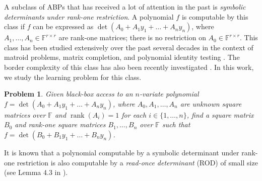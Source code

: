 \documentclass[11pt,letterpaper]{article}
\DeclareMathOperator*{\rank}{rank}
\newcommand{\F}{\mathbb{F}}
\newtheorem{problem}{Problem}[section]
\begin{document}
A subclass of ABPs that has received a lot of attention in the past is \emph{symbolic determinants under rank-one restriction}. A polynomial $f$ is computable by this class if $f$ can be expressed as $\det(A_0 + A_1y_1 + \ldots + A_ny_n)$, where $A_1, \ldots, A_n \in \F^{r \times r}$ are rank-one matrices; there is no restriction on $A_0 \in \F^{r \times r}$. This class has been studied extensively over the past several decades in the context of matroid problems, matrix completion, and polynomial identity testing \cite{Edmonds67, Edmonds68, Edmonds79, Lovasz89, Murota93, Geelen99, HarveyKM05, IvanyosKS10, DBLP:journals/jcss/IvanyosKQS15, GT20}. The border complexity of this class has also been recently investigated \cite{CGGR23}. In this work, we study the learning problem for this class.

\begin{problem} \label{prob:learningROD}
Given black-box access to an $n$-variate polynomial $f = \det(A_0 + A_1y_1 + \ldots + A_ny_n)$, where $A_0, A_1, \ldots, A_n$ are unknown square matrices over $\F$ and $\rank(A_i) = 1$ for each $i \in \{1, \ldots, n\}$, find a square matrix $B_0$ and rank-one square matrices $B_1, \ldots, B_n$ over $\F$ such that $f = \det(B_0 + B_1y_1 + \ldots + B_ny_n)$.

\end{problem}

It is known that a polynomial computable by a symbolic determinant under rank-one restriction is also computable by a \emph{read-once determinant} (ROD) of small size (see Lemma 4.3 in \cite{GT20}). \\
\end{document}
